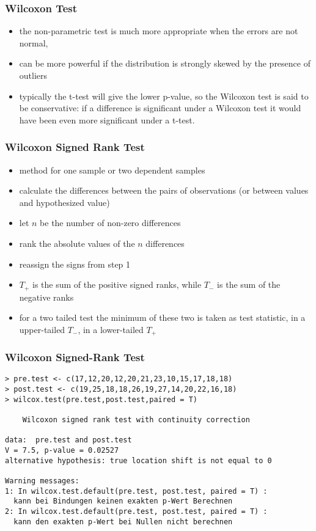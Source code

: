 \documentclass[xcolor={table},handout]{beamer}
\begin{document}
\begin{frame}[fragile]\frametitle{Wilcoxon Test}
\begin{itemize}
\item the non-parametric test is much more appropriate when the errors are not normal, 
\item can be more powerful if the distribution is strongly skewed by the presence of outliers
\item typically the t-test will give the lower p-value, so the Wilcoxon test is said to be conservative: if a difference is significant under a Wilcoxon test it would have been even more significant under a t-test.
\end{itemize}
\end{frame}


\begin{frame}[fragile]\frametitle{Wilcoxon Signed Rank Test}
\begin{itemize}
\item method for one sample or two dependent samples
\item calculate the differences between the pairs of observations (or between values and hypothesized value)
\item let $n$ be the number of non-zero differences
\item rank the absolute values of the $n$ differences
\item reassign the signs from step 1
\item $T_+$ is the sum of the positive signed ranks, while $T_-$ is the sum of the negative ranks
\item for a two tailed test the minimum of these two is taken as test statistic, in a upper-tailed $T_-$, in a lower-tailed $T_+$
\end{itemize}
\end{frame}


\begin{frame}[fragile]\frametitle{Wilcoxon Signed-Rank Test}\footnotesize
\begin{verbatim}
> pre.test <- c(17,12,20,12,20,21,23,10,15,17,18,18)
> post.test <- c(19,25,18,18,26,19,27,14,20,22,16,18)
> wilcox.test(pre.test,post.test,paired = T)

	Wilcoxon signed rank test with continuity correction

data:  pre.test and post.test
V = 7.5, p-value = 0.02527
alternative hypothesis: true location shift is not equal to 0

Warning messages:
1: In wilcox.test.default(pre.test, post.test, paired = T) :
  kann bei Bindungen keinen exakten p-Wert Berechnen
2: In wilcox.test.default(pre.test, post.test, paired = T) :
  kann den exakten p-Wert bei Nullen nicht berechnen
\end{verbatim}
\end{frame}
\end{document}
